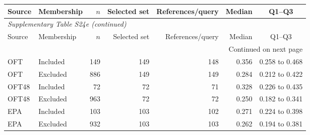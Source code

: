 \begingroup\small\setlength{\tabcolsep}{4pt}\setlength{\LTpre}{0pt}

\begin{longtable}{llrrrrc}

\toprule Source & Membership & $n$ & Selected set & References/query & Median & Q1--Q3 \\ \midrule\endfirsthead

\multicolumn{7}{l}{\textit{Supplementary Table S24e (continued)}} \\

\toprule Source & Membership & $n$ & Selected set & References/query & Median & Q1--Q3 \\ \midrule\endhead

\midrule\multicolumn{7}{r}{Continued on next page}\\\endfoot\bottomrule\endlastfoot

OFT & Included & 149 & 149 & 148 & 0.356 & 0.258 to 0.468 \\

OFT & Excluded & 886 & 149 & 149 & 0.284 & 0.212 to 0.422 \\

OFT48 & Included & 72 & 72 & 71 & 0.328 & 0.226 to 0.435 \\

OFT48 & Excluded & 963 & 72 & 72 & 0.250 & 0.182 to 0.341 \\

EPA & Included & 103 & 103 & 102 & 0.271 & 0.224 to 0.398 \\

EPA & Excluded & 932 & 103 & 103 & 0.262 & 0.194 to 0.381 \\

\end{longtable}\endgroup
